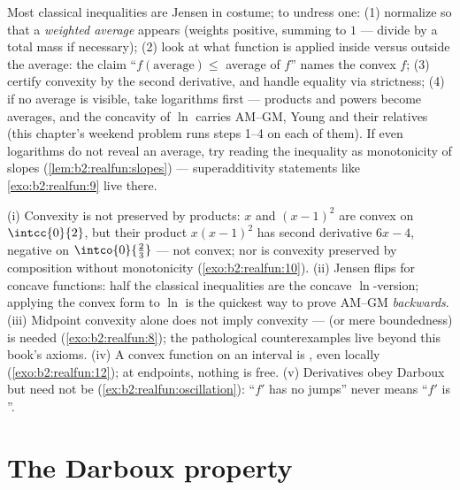 \begin{method}\label{met:b2:realfun:spotting}
Most classical inequalities are Jensen in costume; to undress
one: (1) normalize so that a \emph{weighted average} appears
(weights positive, summing to $1$ --- divide by a total mass if
necessary); (2) look at what function is applied inside versus
outside the average: the claim ``$f(\text{average}) \leq$
average of $f$'' names the convex $f$; (3) certify convexity by
the second derivative, and handle equality via strictness; (4)
if no average is visible, take logarithms first --- products
and powers become averages, and the concavity of $\ln$ carries
AM--GM, Young and their relatives (this chapter's weekend
problem runs steps 1--4 on each of them). If even logarithms do
not reveal an average, try reading the inequality as
monotonicity of slopes (\cref{lem:b2:realfun:slopes}) ---
superadditivity statements like \cref{exo:b2:realfun:9} live
there.
\end{method}

\begin{remark}\label{rem:b2:realfun:pitfalls}
(i) Convexity is not preserved by products: $x$ and $(x - 1)^2$
are convex on $\intcc{0}{2}$, but their product $x(x-1)^2$ has
second derivative $6x - 4$, negative on
$\intco{0}{\frac23}$ --- not convex; nor is convexity preserved
by composition without monotonicity
(\cref{exo:b2:realfun:10}). (ii) Jensen flips for concave
functions: half the classical inequalities are the concave
$\ln$-version; applying the convex form to $\ln$ is the
quickest way to prove AM--GM \emph{backwards}. (iii) Midpoint
convexity alone does not imply convexity ---  (or
mere boundedness) is needed (\cref{exo:b2:realfun:8}); the
pathological counterexamples live beyond this book's axioms. (iv)
A convex function on an \emph{} interval is ,
even locally  (\cref{exo:b2:realfun:12}); at
endpoints, nothing is free. (v) Derivatives obey Darboux but
need not be  (\cref{ex:b2:realfun:oscillation}):
``$f'$ has no jumps'' never means ``$f'$ is ''.
\end{remark}

\section{The Darboux property}


